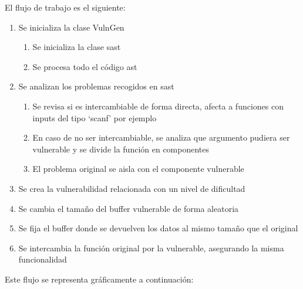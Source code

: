 El flujo de trabajo es el siguiente:

\begin{enumerate}
    \item Se inicializa la clase VulnGen
    \begin{enumerate}
        \item Se inicializa la clase \acrshort{sast}
        \item Se procesa todo el código \acrshort{ast}
    \end{enumerate}
    \item Se analizan los problemas recogidos en \acrshort{sast}
    \begin{enumerate}
        \item Se revisa si es intercambiable de forma directa, afecta a funciones con inputs del tipo `scanf' por ejemplo
        \item En caso de no ser intercambiable, se analiza que argumento pudiera ser vulnerable y se divide la función en componentes
        \item El problema original se aisla con el componente vulnerable
    \end{enumerate}
    \item Se crea la vulnerabilidad relacionada con un nivel de dificultad
    \item Se cambia el tamaño del buffer vulnerable de forma aleatoria
    \item Se fija el buffer donde se devuelven los datos al mismo tamaño que el original
    \item Se intercambia la función original por la vulnerable, asegurando la misma funcionalidad
\end{enumerate}

Este flujo se representa gráficamente a continuación:


